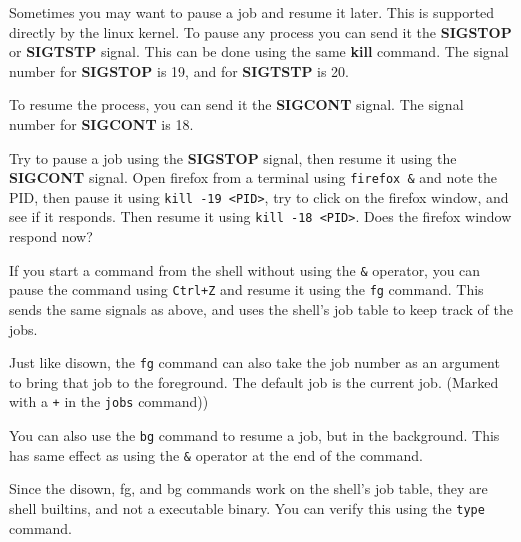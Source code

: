 Sometimes you may want to pause a job and resume it later.
This is supported directly by the linux kernel.
To pause any process you can send it the \textbf{SIGSTOP} or \textbf{SIGTSTP} signal.
This can be done using the same \textbf{kill} command. The signal number for
\textbf{SIGSTOP} is 19, and for \textbf{SIGTSTP} is 20.

To resume the process, you can send it the \textbf{SIGCONT} signal.
The signal number for \textbf{SIGCONT} is 18.

\begin{exercise}
  Try to pause a job using the \textbf{SIGSTOP} signal, then resume it using the
  \textbf{SIGCONT} signal.
  Open firefox from a terminal using \texttt{firefox \&} and note the PID,
  then pause it using
  \texttt{kill -19 <PID>},
  try to click on the firefox window, and see if it responds.
  Then resume it using \texttt{kill -18 <PID>}.
  Does the firefox window respond now?
\end{exercise}

If you start a command from the shell without using the \texttt{\&} operator,
you can pause the command using \texttt{Ctrl+Z} and resume it using the
\texttt{fg} command.
This sends the same signals as above, and uses the shell's job table
to keep track of the jobs.

\begin{remark}
  Just like disown, the \texttt{fg} command can also take the job number
  as an argument to bring that job to the foreground. The default job
  is the current job. (Marked with a \texttt{+} in the \texttt{jobs} command))
\end{remark}

You can also use the \texttt{bg} command to resume a job, but in the background.
This has same effect as using the \texttt{\&} operator at the end of the command.

\begin{remark}
  Since the disown, fg, and bg commands work on the shell's job table,
  they are shell builtins, and not a executable binary.
  You can verify this using the \texttt{type} command.
\end{remark}

